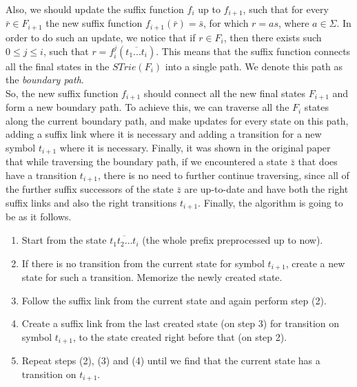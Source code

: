 \documentclass[paper=a4, fontsize=11pt]{scrartcl} %
\numberwithin{equation}{section} %
\numberwithin{figure}{section} %
\numberwithin{table}{section} %
\begin{document}
Also, we should update the suffix function $f_i$ up to $f_{i+1}$, such that for every $\bar{r} \in F_{i+1}$ the new suffix function $f_{i+1}(\bar{r}) = \bar{s}$, for which $r = as$, where $a \in \Sigma$. In order to do such an update, we notice that if $r \in F_i$, then there exists such $0 \le j \le i$, such that $r = f_i^j(\overline{t_1...t_i})$. This means that the suffix function connects all the final states in the $STrie(F_i)$ into a single path. We denote this path as the \textit{boundary path}.\\

So, the new suffix function $f_{i+1}$ should connect all the new final states $F_{i+1}$ and form a new boundary path. To achieve this, we can traverse all the $F_i$ states along the current boundary path, and make updates for every state on this path, adding a suffix link where it is necessary and adding a transition for a new symbol $t_{i+1}$ where it is necessary. Finally, it was shown in the original paper~\cite{ukkonen1995online} that while traversing the boundary path, if we encountered a state $\bar{z}$ that does have a transition $t_{i+1}$, there is no need to further continue traversing, since all of the further suffix successors of the state $\bar{z}$ are up-to-date and have both the right suffix links and also the right transitions $t_{i+1}$. Finally, the algorithm is going to be as it follows.

\begin{enumerate}
  \item Start from the state $\overline{t_1 t_2 \dots t_i}$ (the whole prefix preprocessed up to now).
  \item If there is no transition from the current state for symbol $t_{i+1}$, create a new state for such a transition. Memorize the newly created state.
  \item Follow the suffix link from the current state and again perform step (2).
  \item Create a suffix link from the last created state (on step 3) for transition on symbol $t_{i+1}$, to the state created right before that (on step 2).
  \item Repeat steps (2), (3) and (4) until we find that the current state has a transition on $t_{i+1}$.
\end{enumerate}
\end{document}

